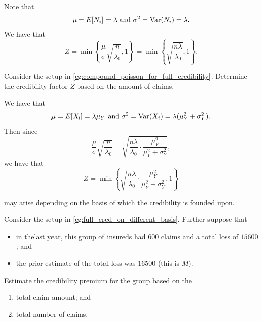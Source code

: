 \documentclass[notoc,notitlepage]{tufte-book}
\begin{document}
\begin{solution}
  Note that
  \begin{equation*}
    \mu = E[N_i] = \lambda \text{ and } \sigma^2 = \operatorname{Var}(N_i) = \lambda.
  \end{equation*}
  We have that
  \begin{equation*}
    Z = \min \left\{ \frac{\mu}{\sigma} \sqrt{\frac{n}{\lambda_0}}, 1 \right\}
    = \min \left\{ \sqrt{\frac{n\lambda}{\lambda_0}}, 1 \right\}.
  \end{equation*}
\end{solution}

\begin{eg}
  Consider the setup in \cref{eg:compound_poisson_for_full_credibility}.
  Determine the credibility factor $Z$ based on the amount of claims.
\end{eg}

\begin{solution}
  We have that
  \begin{equation*}
    \mu = E[X_i] = \lambda \mu_Y \text{ and } \sigma^2 = \operatorname{Var}(X_i) = \lambda
    (\mu^2_Y + \sigma^2_Y).
  \end{equation*}
  Then since
  \begin{equation*}
    \frac{\mu}{\sigma} \sqrt{\frac{n}{\lambda_0}} =
    \sqrt{\frac{n\lambda}{\lambda_0} \cdot \frac{\mu^2_Y}{\mu^2_Y +
    \sigma^2_Y}},
  \end{equation*}
  we have that
  \begin{equation*}
    Z = \min \left\{ \sqrt{\frac{n\lambda}{\lambda_0} \cdot \frac{\mu^2_Y}{\mu^2_Y +
    \sigma^2_Y}}, 1 \right\}
  \end{equation*}
\end{solution}

 may arise depending on the basis of
which the credibility is founded upon.

\begin{eg}
  Consider the setup in \cref{eg:full_cred_on_different_basis}. Further suppose
  that
  \begin{itemize}
    \item in thelast year, this group of insureds had $600$ claims and a total
      loss of $15600$ ; and
    \item the prior estimate of the total loss was $16500$ (this is $M$).
  \end{itemize}
  Estimate the credibility premium for the group based on the
  \begin{enumerate}
    \item total claim amount; and
    \item total number of claims.
  \end{enumerate}
\end{eg}
\end{document}
